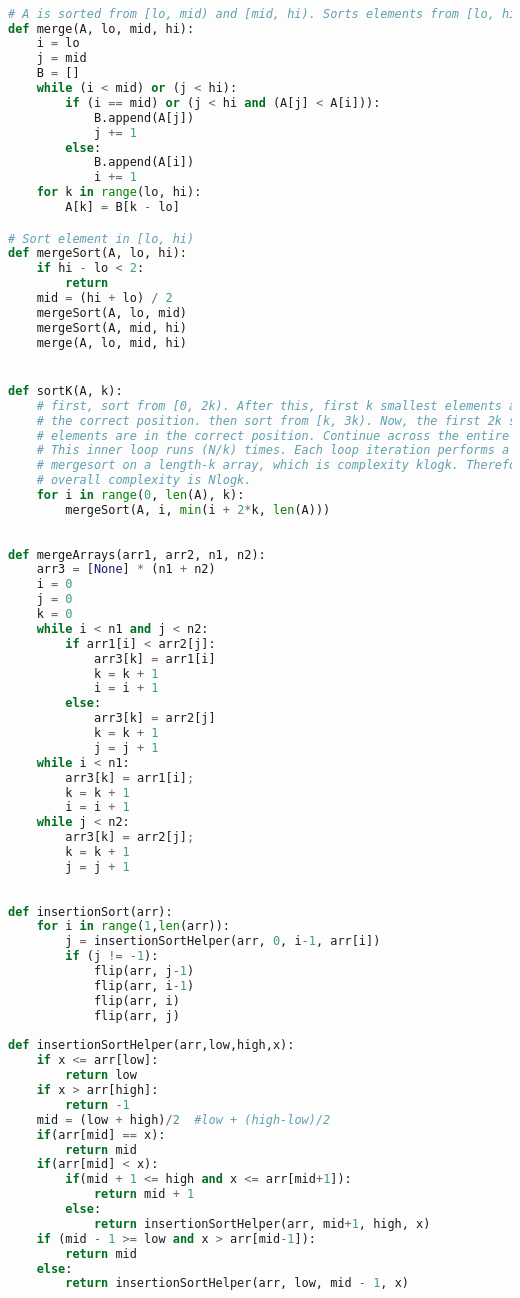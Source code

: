 \documentclass{article}
\begin{document}
\begin{lstlisting}[language=Python]

# A is sorted from [lo, mid) and [mid, hi). Sorts elements from [lo, hi)
def merge(A, lo, mid, hi):
    i = lo
    j = mid
    B = []
    while (i < mid) or (j < hi):
        if (i == mid) or (j < hi and (A[j] < A[i])):
            B.append(A[j])
            j += 1
        else:
            B.append(A[i])
            i += 1
    for k in range(lo, hi):
        A[k] = B[k - lo]

# Sort element in [lo, hi)
def mergeSort(A, lo, hi):
    if hi - lo < 2:
        return
    mid = (hi + lo) / 2
    mergeSort(A, lo, mid)
    mergeSort(A, mid, hi)
    merge(A, lo, mid, hi)


def sortK(A, k):
    # first, sort from [0, 2k). After this, first k smallest elements are in
    # the correct position. then sort from [k, 3k). Now, the first 2k smallest
    # elements are in the correct position. Continue across the entire array.
    # This inner loop runs (N/k) times. Each loop iteration performs a
    # mergesort on a length-k array, which is complexity klogk. Therefore,
    # overall complexity is Nlogk.
    for i in range(0, len(A), k):
        mergeSort(A, i, min(i + 2*k, len(A)))
        
        
def mergeArrays(arr1, arr2, n1, n2): 
    arr3 = [None] * (n1 + n2) 
    i = 0
    j = 0
    k = 0
    while i < n1 and j < n2: 
        if arr1[i] < arr2[j]: 
            arr3[k] = arr1[i] 
            k = k + 1
            i = i + 1
        else: 
            arr3[k] = arr2[j] 
            k = k + 1
            j = j + 1
    while i < n1: 
        arr3[k] = arr1[i]; 
        k = k + 1
        i = i + 1
    while j < n2: 
        arr3[k] = arr2[j]; 
        k = k + 1
        j = j + 1
        
        
def insertionSort(arr): 
    for i in range(1,len(arr)): 
        j = insertionSortHelper(arr, 0, i-1, arr[i]) 
        if (j != -1): 
            flip(arr, j-1) 
            flip(arr, i-1) 
            flip(arr, i) 
            flip(arr, j) 
            
def insertionSortHelper(arr,low,high,x): 
    if x <= arr[low]: 
        return low 
    if x > arr[high]: 
        return -1
    mid = (low + high)/2  #low + (high-low)/2 
    if(arr[mid] == x): 
        return mid 
    if(arr[mid] < x): 
        if(mid + 1 <= high and x <= arr[mid+1]): 
            return mid + 1
        else: 
            return insertionSortHelper(arr, mid+1, high, x) 
    if (mid - 1 >= low and x > arr[mid-1]): 
        return mid 
    else: 
        return insertionSortHelper(arr, low, mid - 1, x) 

\end{lstlisting}
\end{document}
